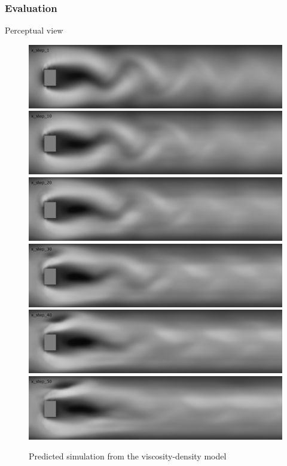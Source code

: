 \documentclass[18pt, xcolor=table]{beamer}
\begin{document}
\begin{frame}[t]
  \frametitle{Evaluation}
  \large{Perceptual view}
  \begin{center}
    \begin{figure}[htb]
    \includegraphics[scale=0.15]{images/rec_flow/x_step_1}
    \includegraphics[scale=0.15]{images/rec_flow/x_step_10}
    \includegraphics[scale=0.15]{images/rec_flow/x_step_20}
    \includegraphics[scale=0.15]{images/rec_flow/x_step_30}
    \includegraphics[scale=0.15]{images/rec_flow/x_step_40}
    \includegraphics[scale=0.15]{images/rec_flow/x_step_50}
    \caption{Predicted simulation from the viscosity-density model}
  \end{figure}
  \end{center}
\end{frame}
\end{document}
